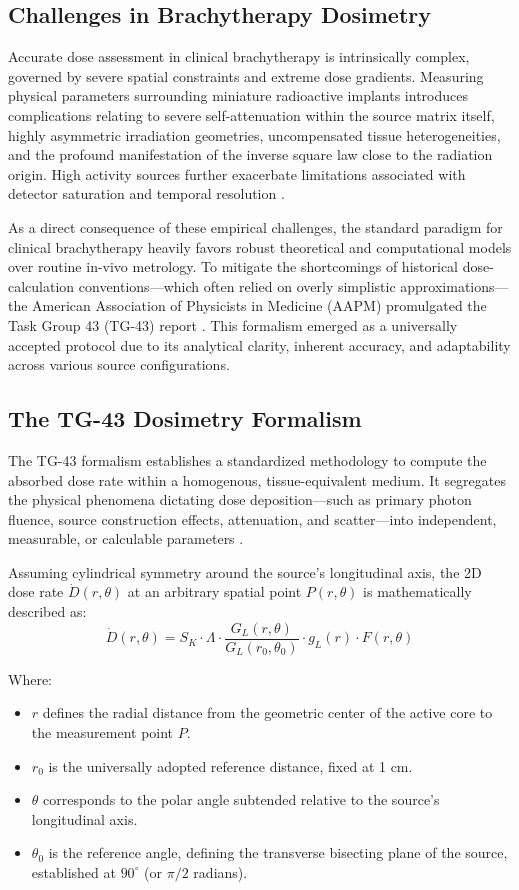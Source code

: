 \subsection{Challenges in Brachytherapy Dosimetry}
Accurate dose assessment in clinical brachytherapy is intrinsically complex, governed by severe spatial constraints and extreme dose gradients. Measuring physical parameters surrounding miniature radioactive implants introduces complications relating to severe self-attenuation within the source matrix itself, highly asymmetric irradiation geometries, uncompensated tissue heterogeneities, and the profound manifestation of the inverse square law close to the radiation origin. High activity sources further exacerbate limitations associated with detector saturation and temporal resolution \cite{podgorsak2005radiation}.

As a direct consequence of these empirical challenges, the standard paradigm for clinical brachytherapy heavily favors robust theoretical and computational models over routine in-vivo metrology. To mitigate the shortcomings of historical dose-calculation conventions—which often relied on overly simplistic approximations—the American Association of Physicists in Medicine (AAPM) promulgated the Task Group 43 (TG-43) report \cite{nath1995dosimetry}. This formalism emerged as a universally accepted protocol due to its analytical clarity, inherent accuracy, and adaptability across various source configurations.

\subsection{The TG-43 Dosimetry Formalism}
The TG-43 formalism establishes a standardized methodology to compute the absorbed dose rate within a homogenous, tissue-equivalent medium. It segregates the physical phenomena dictating dose deposition—such as primary photon fluence, source construction effects, attenuation, and scatter—into independent, measurable, or calculable parameters \cite{rivard2004update}.

Assuming cylindrical symmetry around the source's longitudinal axis, the 2D dose rate $\dot{D}(r,\theta)$ at an arbitrary spatial point $P(r,\theta)$ is mathematically described as:
\begin{equation}
\dot{D}(r, \theta) = S_K \cdot \Lambda \cdot \frac{G_L(r, \theta)}{G_L(r_0, \theta_0)} \cdot g_L(r) \cdot F(r, \theta)
\end{equation}

Where:
\begin{itemize}
    \item $r$ defines the radial distance from the geometric center of the active core to the measurement point $P$.
    \item $r_0$ is the universally adopted reference distance, fixed at 1 cm.
    \item $\theta$ corresponds to the polar angle subtended relative to the source's longitudinal axis.
    \item $\theta_0$ is the reference angle, defining the transverse bisecting plane of the source, established at $90^\circ$ (or $\pi/2$ radians).
\end{itemize}


